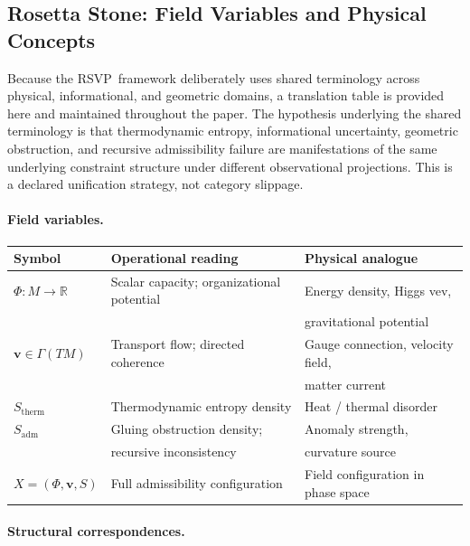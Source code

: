 \documentclass[12pt,a4paper]{article}
\newcommand{\RSVP}{\textrm{RSVP}}
\begin{document}
\subsection{Rosetta Stone: Field Variables and Physical Concepts}

Because the \RSVP\ framework deliberately uses shared terminology across
physical, informational, and geometric domains, a translation table is
provided here and maintained throughout the paper. The hypothesis underlying
the shared terminology is that thermodynamic entropy, informational uncertainty,
geometric obstruction, and recursive admissibility failure are manifestations
of the same underlying constraint structure under different observational
projections. This is a declared unification strategy, not category slippage.

\paragraph{Field variables.}

\medskip
{\small
\begin{center}
\begin{tabular}{p{2.8cm}p{3.8cm}p{4.8cm}}
\toprule
\textbf{Symbol} & \textbf{Operational reading} & \textbf{Physical analogue}\\
\midrule
$\Phi:M\to\mathbb{R}$ & Scalar capacity; organizational potential & Energy density, Higgs vev,\\
 & & \quad gravitational potential\\[3pt]
$\mathbf{v}\in\Gamma(TM)$ & Transport flow; directed coherence & Gauge connection, velocity field,\\
 & & \quad matter current\\[3pt]
$S_\mathrm{therm}$ & Thermodynamic entropy density & Heat / thermal disorder\\[3pt]
$S_\mathrm{adm}$ & Gluing obstruction density; & Anomaly strength,\\
 & \quad recursive inconsistency & \quad curvature source\\[3pt]
$X=(\Phi,\mathbf{v},S)$ & Full admissibility configuration & Field configuration in phase space\\
\bottomrule
\end{tabular}
\end{center}
}

\paragraph{Structural correspondences.}
\end{document}

